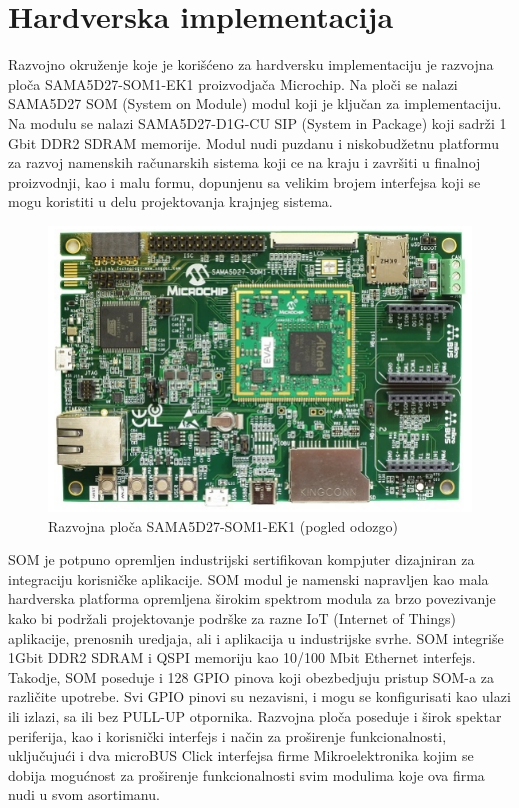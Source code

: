 \documentclass[a4paper,12pt, master]{etf}
\begin{document}
	\newpage

	\chapter{Hardverska implementacija}

	Razvojno okru\v{z}enje koje je kori\v{s}\'{c}eno za hardversku implementaciju je razvojna
	plo\v{c}a SAMA5D27-SOM1-EK1 proizvodja\v{c}a Microchip. Na plo\v{c}i se nalazi SAMA5D27
	SOM (System on Module) modul koji je klju\v{c}an za implementaciju. Na modulu se nalazi
	SAMA5D27-D1G-CU SIP (System in Package) koji sadr\v{z}i 1 Gbit DDR2 SDRAM memorije. Modul
	nudi puzdanu i niskobud\v{z}etnu platformu	za razvoj namenskih ra\v{c}unarskih sistema
	koji ce na kraju i zavr\v{s}iti u finalnoj proizvodnji, kao i malu formu, dopunjenu sa
	velikim brojem interfejsa koji se mogu koristiti u delu projektovanja krajnjeg sistema.

        \begin{figure}[htb]
                \centering
                \includegraphics[scale=.7]{../pic/hw_top_view.png}
                \caption{Razvojna plo\v{c}a SAMA5D27-SOM1-EK1 (pogled odozgo)}
                \label{fig:hw_top_view}
        \end{figure}

	SOM je potpuno opremljen industrijski sertifikovan kompjuter dizajniran za integraciju
	korisni\v{c}ke aplikacije. SOM modul je namenski napravljen kao mala hardverska platforma
	opremljena \v{s}irokim spektrom modula za brzo povezivanje kako bi podr\v{z}ali
	projektovanje podr\v{s}ke za razne IoT (Internet of Things) aplikacije, prenosnih uredjaja,
	ali i aplikacija u industrijske svrhe. SOM integri\v{s}e 1Gbit DDR2 SDRAM i QSPI memoriju
	kao 10/100 Mbit Ethernet interfejs. Takodje, SOM poseduje i 128 GPIO pinova
	koji obezbedjuju pristup SOM-a za razli\v{c}ite upotrebe. Svi GPIO pinovi su nezavisni, i
	mogu se konfigurisati kao ulazi	ili izlazi, sa ili bez PULL-UP otpornika. Razvojna plo\v{c}a
	poseduje  i \v{s}irok spektar periferija, kao i korisni\v{c}ki interfejs i na\v{c}in za
	pro\v{s}irenje funkcionalnosti, uklju\v{c}uju\'{c}i i dva microBUS Click interfejsa firme
	Mikroelektronika kojim se dobija mogu\'{c}nost za pro\v{s}irenje funkcionalnosti svim
	modulima koje ova firma nudi u svom asortimanu.
\end{document}
